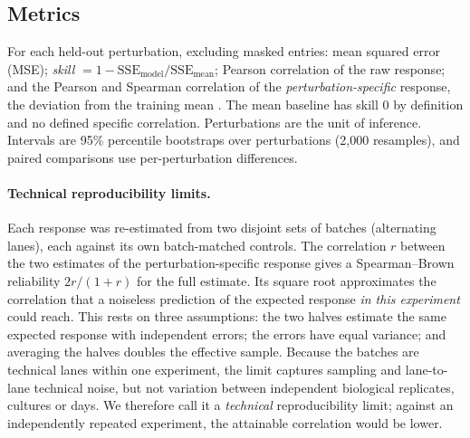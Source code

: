 \subsection{Metrics}
For each held-out perturbation, excluding masked entries: mean squared error (MSE); \emph{skill} $=1-\mathrm{SSE}_{\text{model}}/\mathrm{SSE}_{\text{mean}}$; Pearson correlation of the raw response; and the Pearson and Spearman correlation of the \emph{perturbation-specific} response, the deviation from the training mean \citep[cf.\ the perturbed-centroid reference of][]{vinastorne2025}. The mean baseline has skill 0 by definition and no defined specific correlation. Perturbations are the unit of inference. Intervals are 95\% percentile bootstraps over perturbations (2{,}000 resamples), and paired comparisons use per-perturbation differences.

\paragraph{Technical reproducibility limits.} Each response was re-estimated from two disjoint sets of batches (alternating lanes), each against its own batch-matched controls. The correlation $r$ between the two estimates of the perturbation-specific response gives a Spearman--Brown \citep{spearman1910,brown1910} reliability $2r/(1+r)$ for the full estimate. Its square root approximates the correlation that a noiseless prediction of the expected response \emph{in this experiment} could reach. This rests on three assumptions: the two halves estimate the same expected response with independent errors; the errors have equal variance; and averaging the halves doubles the effective sample. Because the batches are technical lanes within one experiment, the limit captures sampling and lane-to-lane technical noise, but not variation between independent biological replicates, cultures or days. We therefore call it a \emph{technical} reproducibility limit; against an independently repeated experiment, the attainable correlation would be lower.

